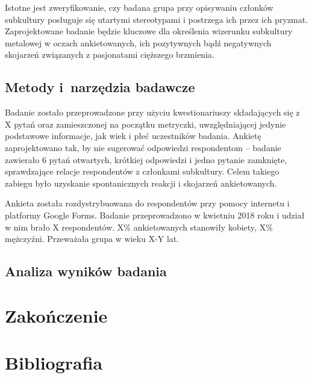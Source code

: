 \documentclass[12pt, a4paper, titlepage]{report}
\begin{document}
Istotne jest zweryfikowanie, czy badana grupa przy opisywaniu członków subkultury posługuje się utartymi stereotypami i postrzega ich przez ich pryzmat. Zaprojektowane badanie będzie kluczowe dla określenia wizerunku subkultury metalowej w oczach ankietowanych, ich pozytywnych bądź negatywnych skojarzeń związanych z pasjonatami cięższego brzmienia. 

\section{Metody i~narzędzia badawcze}
Badanie zostało przeprowadzone przy użyciu kwestionariuszy składających się z X pytań oraz zamieszczonej na początku metryczki, uwzględniającej jedynie podstawowe informacje, jak wiek i płeć uczestników badania. Ankietę zaprojektowano tak, by nie sugerować odpowiedzi respondentom -- badanie zawierało 6 pytań otwartych, krótkiej odpowiedzi i jedno pytanie zamknięte, sprawdzające relacje respondentów z członkami subkultury. Celem takiego zabiegu było uzyskanie spontanicznych reakcji i skojarzeń ankietowanych. 

Ankieta została rozdystrybuowana do respondentów przy pomocy internetu i platformy Google Forms. Badanie przeprowadzono w kwietniu 2018 roku i udział w nim brało X respondentów. X\% ankietowanych stanowiły kobiety, X\% mężczyźni. Przeważała grupa w wieku X-Y lat. 

\section{Analiza wyników badania}
\chapter*{Zakończenie}
\chapter*{Bibliografia}
\end{document}
